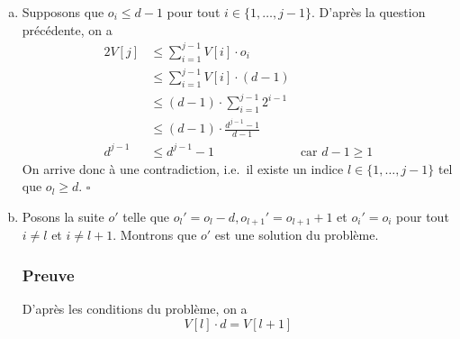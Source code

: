\documentclass[12pt,a4paper]{article}
\begin{document}
\begin{enumerate}[a)]
 En utilisant le r\'esultat de la question pr\'ec\'edente, il en r\'esulte que
 \begin{equation*}
    V[j]\cdot g_j \leq \displaystyle\sum_{i=1}^{j} V[i]\cdot o_i
 \end{equation*}
 
 D'o\`u, 
 \begin{equation*}
    V[j]\cdot (g_j - o_j) \leq \displaystyle\sum_{i=1}^{j-1} V[i]\cdot o_i 
 \end{equation*}
 Or $g_j - o_j \geq 1$ d'apr\`es la question a) et le fait que ce sont des entiers naturels.
 Donc, \( V[j] \leq \displaystyle\sum_{i=1}^{j-1} V[i]\cdot o_i\) \hfill\ensuremath{\square}
 
 Cette propri\'et\'e pr\'ecise l'une des mani\`eres d'utiliser le moins possible de bocaux pour remplir une quantit\'e de confiture donn\'ee. En effet, elle consiste \`a remplir au complet tous les bocaux des plus grandes capacit\'es possibles jusqu'\`a l'arriv\'ee \`a une certaine capacit\'e. Pour cette derni\`ere, on pr\'ef\`ere ne pas remplir tous les bocaux possibles, mais de se servir plut\^ot de ceux de capacit\'e plus petite. 
 
 \item Supposons que $o_i \leq d-1$ pour tout $i \in \{1,\dotsc,j-1\}$. D'apr\`es la question pr\'ec\'edente, on a 
 \begin{alignat*}{2}
 	V[j] &\leq \displaystyle\sum_{i=1}^{j-1} V[i]\cdot o_i \\
 		 &\leq \displaystyle\sum_{i=1}^{j-1} V[i]\cdot (d-1) \\
 		 &\leq (d-1)\cdot \displaystyle\sum_{i=1}^{j-1} 2^{i-1} \\
 		 &\leq (d-1)\cdot \frac{d^{j-1}-1}{d-1} \\
 	d^{j-1}	 &\leq d^{j-1}-1 & \text{car } d-1 \geq 1
 \end{alignat*}
 On arrive donc \`a une contradiction, i.e.\ il existe un indice \(l \in \{1,\dotsc,j-1\}\) tel que $o_l \geq d$. \hfill\ensuremath{\square}
 
 \item Posons la suite $o'$ telle que $o_{l}' = o_l-d, o_{l+1}' = o_{l+1}+1$ et $o_i' = o_i$ pour tout $i \neq l$ et $i \neq l+1$. Montrons que $o'$ est une solution du probl\`eme.
 
 \subsubsection*{Preuve}
 D'apr\`es les conditions du probl\`eme, on a
 \begin{equation*}
    V[l]\cdot d = V[l+1]
 \end{equation*}
 

\end{enumerate}
\end{document}
